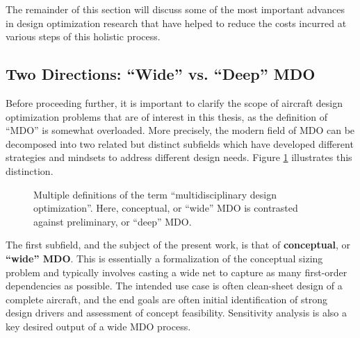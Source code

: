 \documentclass[12pt,vi,oneside]{report}
\begin{document}
    The remainder of this section will discuss some of the most important advances in design optimization research that have helped to reduce the costs incurred at various steps of this holistic process.

    \subsection{Two Directions: ``Wide'' vs. ``Deep'' MDO}
    \label{sec:wide_vs_deep}

    Before proceeding further, it is important to clarify the scope of aircraft design optimization problems that are of interest in this thesis, as the definition of ``MDO'' is somewhat overloaded. More precisely, the modern field of MDO can be decomposed into two related but distinct subfields which have developed different strategies and mindsets to address different design needs. Figure \ref{fig:mdo_overloaded_term} illustrates this distinction.

    \begin{figure}[h]
        \centering
        \caption{Multiple definitions of the term ``multidisciplinary design optimization''. Here, conceptual, or ``wide'' MDO is contrasted against preliminary, or ``deep'' MDO.}
        \label{fig:mdo_overloaded_term}
    \end{figure}

    The first subfield, and the subject of the present work, is that of \textbf{conceptual}, or \textbf{``wide'' MDO}. This is essentially a formalization of the conceptual sizing problem and typically involves casting a wide net to capture as many first-order dependencies as possible. The intended use case is often clean-sheet design of a complete aircraft, and the end goals are often initial identification of strong design drivers and assessment of concept feasibility. Sensitivity analysis is also a key desired output of a wide MDO process.
\end{document}
